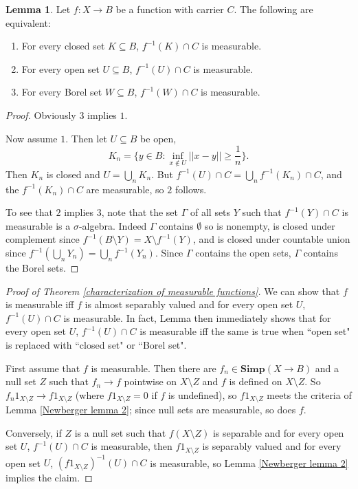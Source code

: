 \documentclass[12pt]{book}
\newcommand{\Simp}{\mathbf{Simp}}
\theoremstyle{definition}
\newtheorem{lemma}[theorem]{Lemma}
\begin{document}
\begin{lemma}
\label{Newberger lemma 3}
Let $f: X \to B$ be a function with carrier $C$. The following are equivalent:
\begin{enumerate}
\item For every closed set $K \subseteq B$, $f^{-1}(K) \cap C$ is measurable.
\item For every open set $U \subseteq B$, $f^{-1}(U) \cap C$ is measurable.
\item For every Borel set $W \subseteq B$, $f^{-1}(W) \cap C$ is measurable.
\end{enumerate}
\end{lemma}
\begin{proof}
Obviously $3$ implies $1$.

Now assume $1$. Then let $U \subseteq B$ be open,
$$K_n = \{y \in B: \inf_{x \notin U} ||x - y|| \geq \frac{1}{n}\}.$$
Then $K_n$ is closed and $U = \bigcup_n K_n$. But $f^{-1}(U) \cap C = \bigcup_n f^{-1}(K_n) \cap C$, and the $f^{-1}(K_n) \cap C$ are measurable, so $2$ follows.

To see that $2$ implies $3$, note that the set $\Gamma$ of all sets $Y$ such that $f^{-1}(Y) \cap C$ is measurable is a $\sigma$-algebra.
Indeed $\Gamma$ contains $\emptyset$ so is nonempty, is closed under complement since $f^{-1}(B \setminus Y) = X \setminus f^{-1}(Y)$, and is closed under countable union since $f^{-1}(\bigcup_n Y_n) = \bigcup_n f^{-1}(Y_n)$.
Since $\Gamma$ contains the open sets, $\Gamma$ contains the Borel sets.
\end{proof}

\begin{proof}[Proof of Theorem \ref{characterization of measurable functions}]
We can show that $f$ is measurable iff $f$ is almost separably valued and for every open set $U$, $f^{-1}(U) \cap C$ is measurable.
In fact, Lemma \label{Newberger lemma 3} then immediately shows that for every open set $U$, $f^{-1}(U) \cap C$ is measurable iff the same is true when ``open set" is replaced with ``closed set" or ``Borel set".

First assume that $f$ is measurable. Then there are $f_n \in \Simp(X \to B)$ and a null set $Z$ such that $f_n \to f$ pointwise on $X \setminus Z$ and $f$ is defined on $X \setminus Z$.
So $f_n1_{X \setminus Z} \to f1_{X \setminus Z}$ (where $f1_{X \setminus Z} = 0$ if $f$ is undefined), so $f1_{X \setminus Z}$ meets the criteria of Lemma \ref{Newberger lemma 2}; since null sets are measurable, so does $f$.

Conversely, if $Z$ is a null set such that $f(X \setminus Z)$ is separable and for every open set $U$, $f^{-1}(U) \cap C$ is measurable, then $f1_{X \setminus Z}$ is separably valued and for every open set $U$, $(f1_{X \setminus Z})^{-1}(U) \cap C$ is measurable, so Lemma \ref{Newberger lemma 2} implies the claim.
\end{proof}
\end{document}
